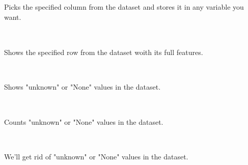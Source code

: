 \documentclass[a4paper,18pt]{article}
\begin{document}

\subsection{\colorbox {matgreen}{\color{white}{\large Data.pop('GROUP NAME')}}}
Picks the specified column from the dataset and stores it in any variable you want.\\\\


\subsection{\colorbox {matgreen}{\color{white}{\large Data.loc[index]}}}
Shows the specified row from the dataset woith its full features.\\\\


\subsection{\colorbox {matgreen}{\color{white}{\large Data.isna()}}}
Shows "unknown" or "None" values in the dataset.\\\\


\subsection{\colorbox {matgreen}{\color{white}{\large Data.isna().sum()}}}
Counts "unknown" or "None" values in the dataset.\\\\


\subsection{\colorbox {matgreen}{\color{white}{\large Data.dropna()}}}
We'll get rid of "unknown" or "None" values in the dataset.\\\\
\end{document}
